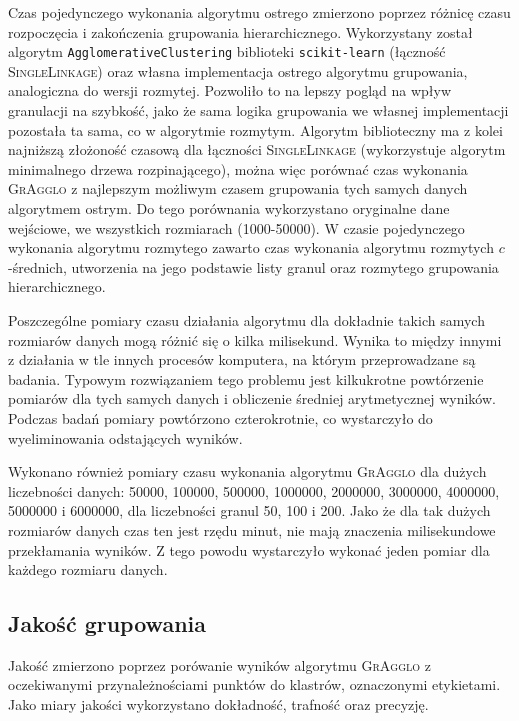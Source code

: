 \documentclass[a4paper,twoside,12pt]{book}
\newcommand{\procedura}[1]{\textsc{#1}}
\newcommand{\SingleLinkage}{\procedura{Si\-ng\-le\-Lin\-ka\-ge}}
\newcommand{\MojAlg}{\procedura{GrAgglo}}
\begin{document}
Czas pojedynczego wykonania algorytmu ostrego zmierzono poprzez różnicę czasu rozpoczęcia i zakończenia grupowania hierarchicznego. Wykorzystany został algorytm \texttt{Ag\-glo\-me\-ra\-ti\-ve\-Clu\-s\-te\-ring} biblioteki \texttt{scikit-learn} (łączność \SingleLinkage{}) oraz własna implementacja ostrego algorytmu grupowania, analogiczna do wersji rozmytej. Pozwoliło to na lepszy pogląd na wpływ granulacji na szybkość, jako że sama logika grupowania we własnej implementacji pozostała ta sama, co w algorytmie rozmytym. Algorytm biblioteczny ma z kolei najniższą złożoność czasową dla łączności \SingleLinkage{} (wykorzystuje algorytm minimalnego drzewa rozpinającego), można więc porównać czas wykonania \MojAlg{} z najlepszym możliwym czasem grupowania tych samych danych algorytmem ostrym. Do tego porównania wykorzystano oryginalne dane wejściowe, we wszystkich rozmiarach (1000-\num{50000}).
W czasie pojedynczego wykonania algorytmu rozmytego zawarto czas wykonania algorytmu rozmytych $c$-średnich, utworzenia na jego podstawie listy granul oraz rozmytego grupowania hierarchicznego.

Poszczególne pomiary czasu działania algorytmu dla dokładnie takich samych rozmiarów danych mogą różnić się o kilka milisekund. Wynika to między innymi z działania w tle innych procesów komputera, na którym przeprowadzane są badania. Typowym rozwiązaniem tego problemu jest kilkukrotne powtórzenie pomiarów dla tych samych danych i obliczenie średniej arytmetycznej wyników. Podczas badań pomiary powtórzono czterokrotnie, co wystarczyło do wyeliminowania odstających wyników.

Wykonano również pomiary czasu wykonania algorytmu \MojAlg{} dla dużych liczebności danych: \num{50000}, \num{100000}, \num{500000}, \num{1000000}, \num{2000000}, \num{3000000}, \num{4000000}, \num{5000000} i \num{6000000}, dla liczebności granul 50, 100 i 200. Jako że dla tak dużych rozmiarów danych czas ten jest rzędu minut, nie mają znaczenia milisekundowe przekłamania wyników. Z tego powodu wystarczyło wykonać jeden pomiar dla każdego rozmiaru danych.

\subsection{Jakość grupowania}

Jakość zmierzono poprzez porówanie wyników algorytmu \MojAlg{} z oczekiwanymi przynależnościami punktów do klastrów, oznaczonymi etykietami. Jako miary jakości wykorzystano dokładność, trafność oraz precyzję.
\end{document}

